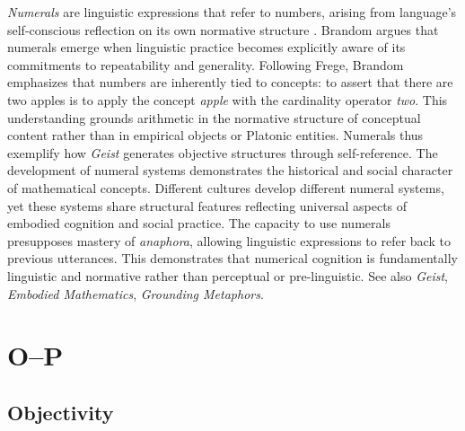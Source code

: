 \documentclass{book}
\begin{document}
\textit{Numerals} are linguistic expressions that refer to numbers, arising from language's self-conscious reflection on its own normative structure \parencite{Brandom:2019aa, Negarestani2018}. Brandom argues that numerals emerge when linguistic practice becomes explicitly aware of its commitments to repeatability and generality. Following Frege, Brandom emphasizes that numbers are inherently tied to concepts: to assert that there are two apples is to apply the concept \textit{apple} with the cardinality operator \textit{two}. This understanding grounds arithmetic in the normative structure of conceptual content rather than in empirical objects or Platonic entities. Numerals thus exemplify how \textit{Geist} generates objective structures through self-reference. The development of numeral systems demonstrates the historical and social character of mathematical concepts. Different cultures develop different numeral systems, yet these systems share structural features reflecting universal aspects of embodied cognition and social practice. The capacity to use numerals presupposes mastery of \textit{anaphora}, allowing linguistic expressions to refer back to previous utterances. This demonstrates that numerical cognition is fundamentally linguistic and normative rather than perceptual or pre-linguistic. See also \textit{Geist}, \textit{Embodied Mathematics}, \textit{Grounding Metaphors}.

\chapter{O--P}

\section{Objectivity}
\end{document}
